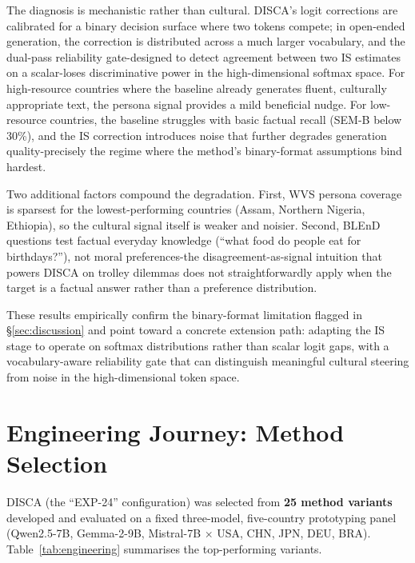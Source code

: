 \documentclass{article}
\begin{document}
The diagnosis is mechanistic rather than cultural. DISCA's logit corrections are calibrated for a binary decision surface where two tokens compete; in open-ended generation, the correction is distributed across a much larger vocabulary, and the dual-pass reliability gate-designed to detect agreement between two IS estimates on a scalar-loses discriminative power in the high-dimensional softmax space. For high-resource countries where the baseline already generates fluent, culturally appropriate text, the persona signal provides a mild beneficial nudge. For low-resource countries, the baseline struggles with basic factual recall (SEM-B below 30\%), and the IS correction introduces noise that further degrades generation quality-precisely the regime where the method's binary-format assumptions bind hardest.

Two additional factors compound the degradation. First, WVS persona coverage is sparsest for the lowest-performing countries (Assam, Northern Nigeria, Ethiopia), so the cultural signal itself is weaker and noisier. Second, BLEnD questions test factual everyday knowledge (``what food do people eat for birthdays?''), not moral preferences-the disagreement-as-signal intuition that powers DISCA on trolley dilemmas does not straightforwardly apply when the target is a factual answer rather than a preference distribution.

These results empirically confirm the binary-format limitation flagged in \S\ref{sec:discussion} and point toward a concrete extension path: adapting the IS stage to operate on softmax distributions rather than scalar logit gaps, with a vocabulary-aware reliability gate that can distinguish meaningful cultural steering from noise in the high-dimensional token space.

\section{Engineering Journey: Method Selection}
\label{app:engineering}

DISCA (the ``EXP-24'' configuration) was selected from \textbf{25 method
variants} developed and evaluated on a fixed three-model, five-country prototyping
panel (Qwen2.5-7B, Gemma-2-9B, Mistral-7B $\times$ USA, CHN, JPN, DEU, BRA).
Table~\ref{tab:engineering} summarises the top-performing variants.
\end{document}
